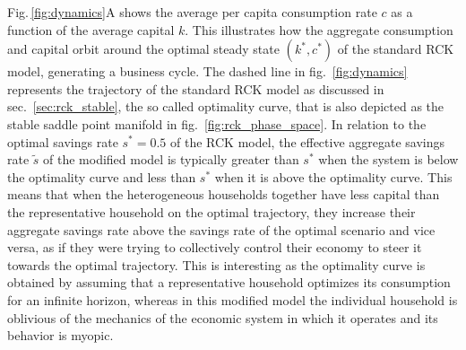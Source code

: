 Fig.\,\ref{fig:dynamics}A shows the average per capita consumption rate $c$ as a function of the average capital $k$. 
This illustrates how the aggregate consumption and capital orbit around the optimal steady state $(k^\ast,c^\ast)$  of the standard RCK model, generating a business cycle. 
The dashed line in fig.~\ref{fig:dynamics} represents the trajectory of the standard RCK model as discussed in sec.~\ref{sec:rck_stable}, the so called optimality curve, that is also depicted as the stable saddle point manifold in fig.~\ref{fig:rck_phase_space}.
In relation to the optimal savings rate $s^\ast \!=\!0.5$ of the RCK model, the effective aggregate savings rate $\tilde{s}$ of the modified model is typically greater than $s^\ast$ when the system is below the optimality curve and less than $ s^\ast$ when it is above the optimality curve. This means that when the heterogeneous households together have less capital than the representative household on the optimal trajectory, they increase their aggregate savings rate above the savings rate of the optimal scenario and vice versa, as if they were trying to collectively control their economy to steer it towards the optimal trajectory.
This is interesting as the optimality curve is obtained by assuming that a representative household optimizes its consumption for an infinite horizon, whereas in this modified model the individual household is oblivious of the mechanics of the economic system in which it operates and its behavior is myopic.

